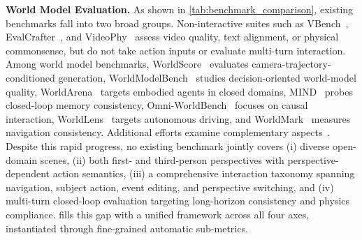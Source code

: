 \textbf{World Model Evaluation.}
As shown in \cref{tab:benchmark_comparison}, existing benchmarks fall into two broad groups.
Non-interactive suites such as VBench~\cite{huang2024vbench,huang2024vbenchplus,zheng2025vbench2}, EvalCrafter~\cite{liu2024evalcrafter}, and VideoPhy~\cite{bansal2024videophy,meng2024phygenbench} assess video quality, text alignment, or physical commonsense, but do not take action inputs or evaluate multi-turn interaction.
Among world model benchmarks, WorldScore~\cite{duan2024worldscore} evaluates camera-trajectory-conditioned generation, WorldModelBench~\cite{wang2024worldmodelbench} studies decision-oriented world-model quality, WorldArena~\cite{shang2026worldarena} targets embodied agents in closed domains, MIND~\cite{ye2026mind} probes closed-loop memory consistency, Omni-WorldBench~\cite{wu2026omniworldbench} focuses on causal interaction, WorldLens~\cite{worldlens2025} targets autonomous driving, and WorldMark~\cite{xu2026worldmark} measures navigation consistency.
Additional efforts examine complementary aspects~\cite{han2025videobench,liu2024fetv,gu2025phyworldbench,cai2025mmgr,upadhyay2026worldbench,lu2025_4dworldbench,gao2026wrena,lian2024worldsimbench,yue2025ewmbench,zhang2025worldinworld,tang2025interbench,zhou2026drivinggen}.
Despite this rapid progress, no existing benchmark jointly covers (i) diverse open-domain scenes, (ii) both first- and third-person perspectives with perspective-dependent action semantics, (iii) a comprehensive interaction taxonomy spanning navigation, subject action, event editing, and perspective switching, and (iv) multi-turn closed-loop evaluation targeting long-horizon consistency and physics compliance.
\benchmark fills this gap with a unified framework across all four axes, instantiated through \numsubmetric fine-grained automatic sub-metrics.


